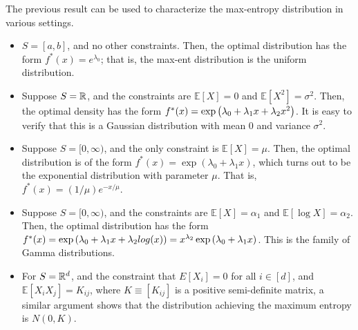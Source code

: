         \begin{example}
            \label{example:max-entropy} The previous result can be used to characterize the max-entropy distribution in various settings. 
            \begin{itemize}
                \item $S=[a, b]$, and no other constraints. Then, the optimal distribution has the form $f^*(x) = e^{\lambda_0}$; that is, the max-ent distribution is the uniform distribution. 
                \item Suppose $S=\mathbb{R}$, and the constraints are $\mathbb{E}[X] = 0$ and $\mathbb{E}[X^2]=\sigma^2$. Then, the optimal density has the form $f^*(x) = \exp \left( \lambda_0 + \lambda_1 x + \lambda_2 x^2 \right)$. It is easy to verify that this is a Gaussian distribution with mean $0$ and variance $\sigma^2$. 
                \item Suppose $S = [0, \infty)$, and the only constraint is $\mathbb{E}[X] = \mu$. Then, the optimal distribution is of the form $f^*(x) = \exp (\lambda_0 + \lambda_1 x)$, which turns out to be the exponential distribution with parameter $\mu$. That is, $f^*(x) = (1/\mu)e^{-x/\mu}$.  
                \item Suppose $S=[0, \infty)$, and the constraints are $\mathbb{E}[X]=\alpha_1$ and $\mathbb{E}[\log X] = \alpha_2$. Then, the optimal distribution has the form $f^*(x) = \exp \left( \lambda_0 + \lambda_1 x + \lambda_2 log(x) \right) = x^{\lambda_2} \exp \left( \lambda_0 + \lambda_1 x \right)$. This is the family of Gamma distributions.  

                \item For $S = \mathbb{R}^d$, and the constraint that $E[X_i]=0$ for all $i\in [d]$, and $\mathbb{E}[X_i X_j] = K_{ij}$, where $K \equiv [K_{ij}]$ is a positive semi-definite matrix, a similar argument shows that the distribution achieving the maximum entropy is $N(0, K)$. 
            \end{itemize}
        \end{example}

            
